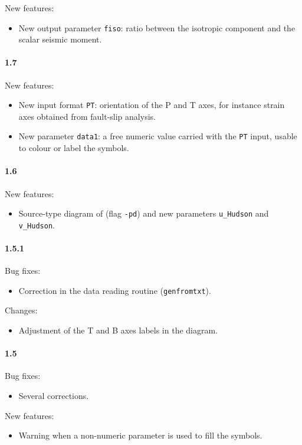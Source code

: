 \documentclass[11pt,a4paper,english]{article}
\numberwithin{equation}{section}
\begin{document}
New features:
\begin{itemize}
\item New output parameter \texttt{fiso}: ratio between the isotropic component and the scalar seismic moment.
\end{itemize}

\paragraph{1.7}

New features:
\begin{itemize}
\item New input format \texttt{PT}: orientation of the P and T axes, for instance strain axes obtained from fault-slip analysis.
\item New parameter \texttt{data1}: a free numeric value carried with the \texttt{PT} input, usable to colour or label the symbols.
\end{itemize}

\paragraph{1.6}

New features:
\begin{itemize}
\item Source-type diagram of \citet{huds89} (flag \texttt{-pd}) and new parameters \texttt{u\_Hudson} and \texttt{v\_Hudson}.
\end{itemize}

\paragraph{1.5.1}

Bug fixes:
\begin{itemize}
\item Correction in the data reading routine (\texttt{genfromtxt}).
\end{itemize}
Changes:
\begin{itemize}
\item Adjustment of the T and B axes labels in the diagram.
\end{itemize}

\paragraph{1.5}

Bug fixes:
\begin{itemize}
\item Several corrections.
\end{itemize}
New features:
\begin{itemize}
\item Warning when a non-numeric parameter is used to fill the symbols.
\end{itemize}
\end{document}
